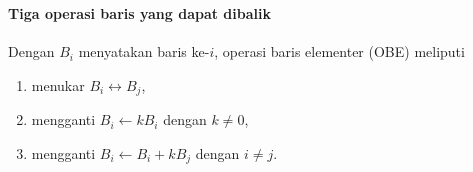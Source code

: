 \documentclass{../../kalkulus-ppt}
\begin{document}
\begin{frame}
    \frametitle{\insertsection}
    \framesubtitle{Tiga operasi baris yang dapat dibalik}
    \begin{definisi}
        Dengan $B_i$ menyatakan baris ke-$i$, operasi baris elementer (OBE) meliputi
        \begin{enumerate}
            \item menukar $B_i\leftrightarrow B_j$,
            \item mengganti $B_i\gets kB_i$ dengan $k\ne0$,
            \item mengganti $B_i\gets B_i+kB_j$ dengan $i\ne j$.
        \end{enumerate}
    \end{definisi}
\end{frame}
\end{document}
